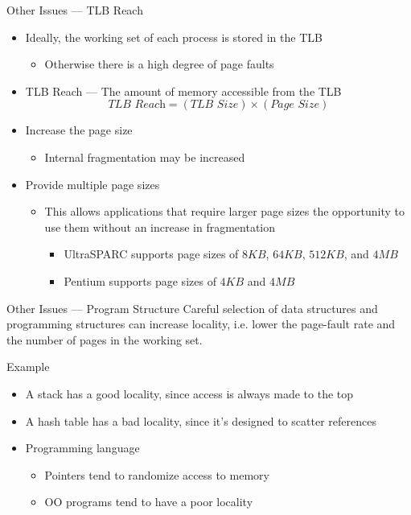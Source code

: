 \begin{frame}{Other Issues --- TLB Reach}
  \begin{itemize}
  \item Ideally, the working set of each process is stored in the TLB
    \begin{itemize}
    \item Otherwise there is a high degree of page faults
    \end{itemize}
  \item \alert{TLB Reach} --- The amount of memory accessible from the TLB
    $$\textit{TLB Reach} = (\textit{TLB Size}) \times (\textit{Page Size})$$
  \item Increase the page size
    \begin{itemize}
    \item[] Internal fragmentation may be increased
    \end{itemize}
  \item Provide multiple page sizes
    \begin{itemize}
    \item This allows applications that require larger page sizes the opportunity to use
      them without an increase in fragmentation
      \begin{itemize}
      \item UltraSPARC supports page sizes of $8KB$, $64KB$, $512KB$, and $4MB$
      \item Pentium supports page sizes of $4KB$ and $4MB$
      \end{itemize}
    \end{itemize}
  \end{itemize}
\end{frame}

\begin{frame}{Other Issues --- Program Structure}
  Careful selection of data structures and programming structures can increase locality,
  i.e. lower the page-fault rate and the number of pages in the working set.
  \begin{iblock}{Example}
    \begin{itemize}
    \item A stack has a good locality, since access is always made to the top
    \item A hash table has a bad locality, since it's designed to scatter references
    \item Programming language
      \begin{itemize}
      \item Pointers tend to randomize access to memory
      \item OO programs tend to have a poor locality
      \end{itemize}
    \end{itemize}
  \end{iblock}
\end{frame}

